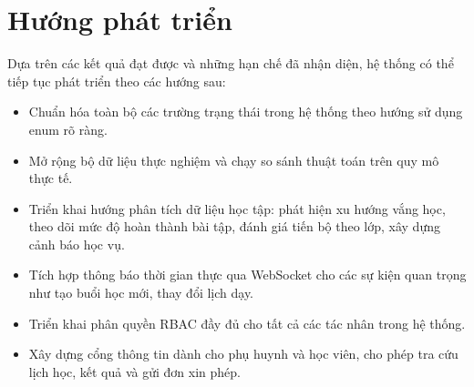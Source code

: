 \documentclass[../DoAn.tex]{subfiles}
\begin{document}
\section{Hướng phát triển}
\label{section:6.3}
Dựa trên các kết quả đạt được và những hạn chế đã nhận diện, hệ thống có thể tiếp tục phát triển theo các hướng sau:

\begin{itemize}
    \item Chuẩn hóa toàn bộ các trường trạng thái trong hệ thống theo hướng sử dụng enum rõ ràng.
    \item Mở rộng bộ dữ liệu thực nghiệm và chạy so sánh thuật toán trên quy mô thực tế.
    \item Triển khai hướng phân tích dữ liệu học tập: phát hiện xu hướng vắng học, theo dõi mức độ hoàn thành bài tập, đánh giá tiến bộ theo lớp, xây dựng cảnh báo học vụ.
    \item Tích hợp thông báo thời gian thực qua WebSocket cho các sự kiện quan trọng như tạo buổi học mới, thay đổi lịch dạy.
    \item Triển khai phân quyền RBAC đầy đủ cho tất cả các tác nhân trong hệ thống.
    \item Xây dựng cổng thông tin dành cho phụ huynh và học viên, cho phép tra cứu lịch học, kết quả và gửi đơn xin phép.
\end{itemize}
\end{document}
